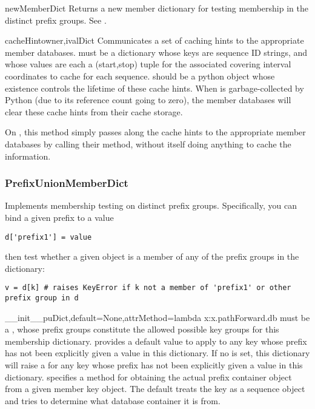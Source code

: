 \documentclass{howto}
\begin{document}
\begin{funcdesc}{newMemberDict}{}
  Returns a new member dictionary for testing membership in
  the distinct prefix groups.  See .
\end{funcdesc}

\begin{funcdesc}{cacheHint}{owner,ivalDict}
  Communicates a set of caching hints to the appropriate member
  databases.   must be a dictionary whose keys are
  sequence ID strings, and whose values are each a (start,stop) tuple
  for the associated covering interval coordinates to
  cache for each sequence.   should be a python object
  whose existence controls the lifetime of these cache hints.
  When  is garbage-collected by Python (due to its 
  reference count going to zero), the member databases will clear
  these cache hints from their cache storage.

  On , this method simply passes along
  the cache hints to the appropriate member databases by calling
  their  method, without itself doing anything
  to cache the information.
\end{funcdesc}



\subsubsection{PrefixUnionMemberDict}
Implements membership testing on distinct prefix groups.  Specifically,
you can bind a given prefix to a value
\begin{verbatim}
d['prefix1'] = value
\end{verbatim}
then test whether a given object  is a member of any of the
prefix groups in the dictionary:
\begin{verbatim}
v = d[k] # raises KeyError if k not a member of 'prefix1' or other prefix group in d
\end{verbatim}

\begin{funcdesc}{__init__}{puDict,default=None,attrMethod=lambda x:x.pathForward.db}
   must be a , whose prefix groups constitute the
  allowed possible key groups for this membership dictionary.  
  provides a default value to apply to any key whose prefix has not been explicitly
  given a value in this dictionary.  If no  is set, this dictionary
  will raise a  for any key whose prefix has not been 
  explicitly given a value in this dictionary.
   specifies a method for obtaining
  the actual prefix container object from a given member key object.  The default
   treats the key as a sequence object and tries to determine what
  database container it is from.
\end{funcdesc}
\end{document}
